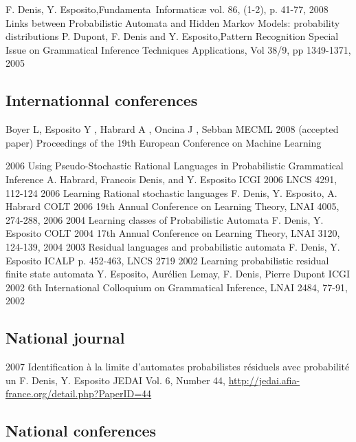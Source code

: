 {F. Denis, Y. Esposito,}{Fundamenta~Informatic\ae{}}
{vol. 86, (1-2), p. 41-77, 2008}\\
{Links between Probabilistic Automata and Hidden Markov Models: probability distributions}
{ P. Dupont, F. Denis and Y. Esposito,}{Pattern Recognition}
{Special Issue on Grammatical Inference Techniques \amper{} Applications, Vol 38/9, pp 1349-1371, 2005}

\subsection*{Internationnal conferences}

{Boyer L, Esposito Y , Habrard A , Oncina J , Sebban M}{ECML 2008}
{(accepted paper) Proceedings of the 19th European Conference on Machine Learning}

\article
{2006} %
{Using Pseudo-Stochastic Rational Languages in Probabilistic Grammatical Inference} %
{A. Habrard, Francois Denis, and Y. Esposito} %
{ICGI 2006} %
{LNCS 4291, 112-124} %
\article
{2006}
{Learning Rational stochastic languages}
{F. Denis, Y. Esposito, A. Habrard}
{COLT 2006}
{19th Annual Conference on Learning Theory, LNAI 4005, 274-288, 2006}
\article
{2004}
{Learning classes of Probabilistic Automata}
{F. Denis, Y. Esposito}
{COLT 2004}
{17th Annual Conference on Learning Theory, LNAI 3120, 124-139, 2004}
\article
{2003}
{Residual languages and probabilistic automata}
{F. Denis, Y. Esposito}
{ICALP}
{p. 452-463, LNCS 2719}
\article
{2002}
{Learning probabilistic residual finite state automata}
{Y. Esposito, Aurélien Lemay, F. Denis, Pierre Dupont}
{ICGI 2002}
{6th International Colloquium on Grammatical Inference,  LNAI 2484, 77-91, 2002}

\subsection*{National journal}

\article
{2007}
{Identification à la limite d'automates probabilistes résiduels avec probabilité un}
{F. Denis, Y. Esposito}
{JEDAI}
{Vol. 6, Number 44, \href{http://jedai.afia-france.org/detail.php?PaperID=44}{http://jedai.afia-france.org/detail.php?PaperID=44}}

\subsection*{National conferences}

